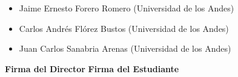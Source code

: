 \documentclass[12pt]{article}
\begin{document}

\begin{itemize}
	\item Jaime Ernesto Forero Romero (Universidad de los Andes)
	\item Carlos Andrés Flórez Bustos (Universidad de los Andes)
	\item Juan Carlos Sanabria Arenas (Universidad de los Andes)
\end{itemize}


{}



{\bf Firma del Director} \hfill {\bf Firma del Estudiante}

\vspace{1.5cm}
\end{document}
